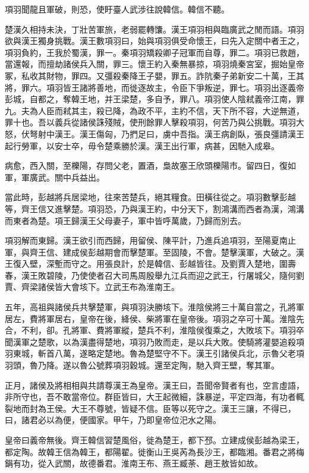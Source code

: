 項羽聞龍且軍破，則恐，使盱臺人武涉往說韓信。韓信不聽。

楚漢久相持未決，丁壯苦軍旅，老弱罷轉馕。漢王項羽相與臨廣武之閒而語。項羽欲與漢王獨身挑戰。漢王數項羽曰，始與項羽俱受命懷王，曰先入定關中者王之，項羽負約，王我於蜀漢，罪一。秦項羽矯殺卿子冠軍而自尊，罪二。項羽已救趙，當還報，而擅劫諸侯兵入關，罪三。懷王約入秦無暴掠，項羽燒秦宮室，掘始皇帝冢，私收其財物，罪四。又彊殺秦降王子嬰，罪五。詐阬秦子弟新安二十萬，王其將，罪六。項羽皆王諸將善地，而徙逐故主，令臣下爭叛逆，罪七。項羽出逐義帝彭城，自都之，奪韓王地，并王梁楚，多自予，罪八。項羽使人陰弒義帝江南，罪九。夫為人臣而弒其主，殺已降，為政不平，主約不信，天下所不容，大逆無道，罪十也。吾以義兵從諸侯誅殘賊，使刑餘罪人擊殺項羽，何苦乃與公挑戰。項羽大怒，伏弩射中漢王。漢王傷匈，乃捫足曰，虜中吾指。漢王病創臥，張良彊請漢王起行勞軍，以安士卒，毋令楚乘勝於漢。漢王出行軍，病甚，因馳入成皋。

病愈，西入關，至櫟陽，存問父老，置酒，梟故塞王欣頭櫟陽市。留四日，復如軍，軍廣武。關中兵益出。

當此時，彭越將兵居梁地，往來苦楚兵，絕其糧食。田橫往從之。項羽數擊彭越等，齊王信又進擊楚。項羽恐，乃與漢王約，中分天下，割鴻溝而西者為漢，鴻溝而東者為楚。項王歸漢王父母妻子，軍中皆呼萬歲，乃歸而別去。

項羽解而東歸。漢王欲引而西歸，用留侯、陳平計，乃進兵追項羽，至陽夏南止軍，與齊王信、建成侯彭越期會而擊楚軍。至固陵，不會。楚擊漢軍，大破之。漢王復入壁，深塹而守之。用張良計，於是韓信、彭越皆往。及劉賈入楚地，圍壽春，漢王敗碧陵，乃使使者召大司馬周殷舉九江兵而迎之武王，行屠城父，隨何劉賈、齊梁諸侯皆大會垓下。立武王布為淮南王。

五年，高祖與諸侯兵共擊楚軍，與項羽決勝垓下。淮陰侯將三十萬自當之，孔將軍居左，費將軍居右，皇帝在後，絳侯、柴將軍在皇帝後。項羽之卒可十萬。淮陰先合，不利，卻。孔將軍、費將軍縱，楚兵不利，淮陰侯復乘之，大敗垓下。項羽卒聞漢軍之楚歌，以為漢盡得楚地，項羽乃敗而走，是以兵大敗。使騎將灌嬰追殺項羽東城，斬首八萬，遂略定楚地。魯為楚堅守不下。漢王引諸侯兵北，示魯父老項羽頭，魯乃降。遂以魯公號葬項羽穀城。還至定陶，馳入齊王壁，奪其軍。

正月，諸侯及將相相與共請尊漢王為皇帝。漢王曰，吾聞帝賢者有也，空言虛語，非所守也，吾不敢當帝位。群臣皆曰，大王起微細，誅暴逆，平定四海，有功者輒裂地而封為王侯。大王不尊號，皆疑不信。臣等以死守之。漢王三讓，不得已，曰，諸君必以為便，便國家。甲午，乃即皇帝位汜水之陽。

皇帝曰義帝無後。齊王韓信習楚風俗，徙為楚王，都下邳。立建成侯彭越為梁王，都定陶。故韓王信為韓王，都陽翟。徙衡山王吳芮為長沙王，都臨湘。番君之將梅鋗有功，從入武關，故德番君。淮南王布、燕王臧荼、趙王敖皆如故。

